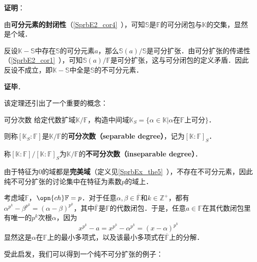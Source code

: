 \textbf{证明}：

由\textbf{可分元素的封闭性}（\autoref{SprbE2_cor4}~），可知$\mathbb{S}$是$\mathbb{F}$的可分闭包与$\mathbb{K}$的交集，显然是个域．

反设$\mathbb{K}-\mathbb{S}$中存在$\mathbb{S}$的可分元素$a$，那么$\mathbb{S}(a)/\mathbb{S}$是可分扩张．由可分扩张的传递性（\autoref{SprbE2_cor1}~），可知$\mathbb{S}(a)/\mathbb{F}$是可分扩张，这与可分闭包的定义矛盾．因此反设不成立，即$\mathbb{K}-\mathbb{S}$中全是$\mathbb{S}$的不可分元素．

\textbf{证毕}．

该定理还引出了一个重要的概念：

\begin{definition}{可分次数}
给定代数扩域$\mathbb{K}/\mathbb{F}$，构造中间域$\mathbb{K}_S=\{\alpha\in\mathbb{K}|\alpha\text{在}\mathbb{F}\text{上可分}\}$．

则称$[\mathbb{K}_S:\mathbb{F}]$是$\mathbb{K}/\mathbb{F}$的\textbf{可分次数（separable degree）}，记为$[\mathbb{K}:\mathbb{F}]_S$．

称$[\mathbb{K}:\mathbb{F}] / [\mathbb{K}:\mathbb{F}]_S$为$\mathbb{K}/\mathbb{F}$的\textbf{不可分次数（inseparable degree）}．
\end{definition}






由于特征为$0$的域都是\textbf{完美域}（定义见\autoref{SprbEx_the5}~），不存在不可分元素，因此纯不可分扩张的讨论集中在特征为素数$p$的域上．

考虑域$\mathbb{F}$，$\opn{ch}\mathbb{F}=p$．对于任意$\alpha, \beta\in\overline{\mathbb{F}}$和$k\in\mathbb{Z}^+$，都有$\alpha^{p^k}-\beta^{p^k}=(\alpha-\beta)^{p^k}$，其中$\overline{\mathbb{F}}$是$\mathbb{F}$的代数闭包．于是，任意$a\in\mathbb{F}$在其代数闭包里有唯一的$p^k$次根$\alpha$，因为
\begin{equation}
x^{p^k}-a=x^{p^k}-\alpha^{p^k}=(x-\alpha)^{p^k}
\end{equation}
显然这是$\alpha$在$\mathbb{F}$上的最小多项式，以及该最小多项式在$\overline{\mathbb{F}}$上的分解．


受此启发，我们可以得到一个纯不可分扩张的例子：

